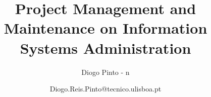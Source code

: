 \documentclass[openany]{./llncs2e/llncs}
\begin{document}
\title{Project Management and Maintenance on Information Systems Administration}
\subtitle{Diogo Pinto - n}
\author{Diogo.Reis.Pinto@tecnico.ulisboa.pt}

\maketitle


\begingroup
\let\cleardoublepage\relax
\let\clearpage\relax
{\def\large{} \def\normalsize{} \tableofcontents}
\endgroup






\newpage

\newpage
\appendix

\newpage


% 
% 
 

 
\end{document}
